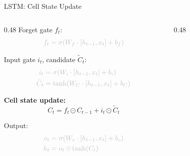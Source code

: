 \begin{frame}{LSTM: Cell State Update}
  \begin{columns}[T]
    \begin{column}{0.48\textwidth}
      \textcolor{gray!50}{Forget gate $f_t$:}
      \[
        \textcolor{gray!50}{f_t = \sigma\!\left(W_f \cdot [h_{t-1}, x_t] + b_f\right)}
      \]

      \textcolor{gray!50}{Input gate $i_t$, candidate $\tilde{C}_t$:}
      \[
      \textcolor{gray!50}{
      \begin{aligned}
        i_t &= \sigma\!\left(W_i \cdot [h_{t-1}, x_t] + b_i\right) \\
        \tilde{C}_t &= \tanh\!\left(W_C \cdot [h_{t-1}, x_t] + b_C\right)
      \end{aligned}
      }
      \]

      \textbf{Cell state update:}
      \[
        \boxed{C_t = f_t \odot C_{t-1} + i_t \odot \tilde{C}_t}
      \]

      \textcolor{gray!50}{Output:}
      \[
      \textcolor{gray!50}{
      \begin{aligned}
        o_t &= \sigma\!\left(W_o \cdot [h_{t-1}, x_t] + b_o\right) \\
        h_t &= o_t \odot \tanh(C_t)
      \end{aligned}
      }
      \]
    \end{column}
    \begin{column}{0.48\textwidth}
      \begin{center}
      \end{center}
    \end{column}
  \end{columns}
\end{frame}

